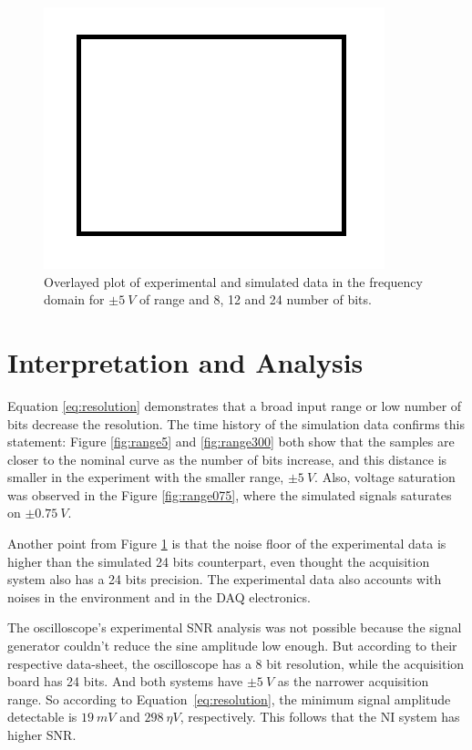 \documentclass[10pt,letterpaper,twocolumn]{article}
\begin{document}
    \begin{figure}[h]
        \centering
        \includegraphics[width=0.8\linewidth]{img/sample.png}
        \caption{Overlayed plot of experimental and simulated data in the frequency domain for $\pm 5\ V$ of range and 8, 12 and 24 number of bits.}
        \label{fig:spectral5}
    \end{figure}


\section{Interpretation and Analysis}
    Equation \ref{eq:resolution} demonstrates that a broad input range or low number of bits decrease the resolution. The time history of the simulation data confirms this statement: Figure \ref{fig:range5} and \ref{fig:range300} both show that the samples are closer to the nominal curve as the number of bits increase, and this distance is smaller in the experiment with the smaller range, $\pm 5\ V$. Also, voltage saturation was observed in the Figure \ref{fig:range075}, where the simulated signals saturates on $\pm 0.75\ V$.
    
    Another point from Figure \ref{fig:spectral5} is that the noise floor of the experimental data is higher than the simulated 24 bits counterpart, even thought the acquisition system also has a 24 bits precision. The experimental data also accounts with noises in the environment and in the DAQ electronics. 
    
    The oscilloscope's experimental SNR analysis was not possible because the signal generator couldn't reduce the sine amplitude low enough. But according to their respective data-sheet, the oscilloscope has a 8 bit resolution, while the acquisition board has 24 bits. And both systems have $\pm 5\ V$ as the narrower acquisition range. So according to Equation~\ref{eq:resolution}, the minimum signal amplitude detectable is $19\ mV$ and $298\ \eta V$, respectively. This follows that the NI system has higher SNR.
    
\end{document}
